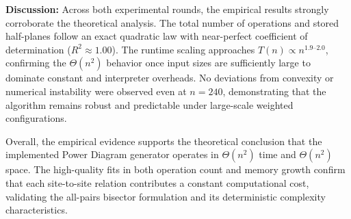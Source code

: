 \documentclass{article}
\begin{document}
\textbf{Discussion:}
Across both experimental rounds, the empirical results strongly corroborate the theoretical analysis.  
The total number of operations and stored half-planes follow an exact quadratic law with near-perfect coefficient of determination ($R^2\!\approx\!1.00$).  
The runtime scaling approaches $T(n)\!\propto\!n^{1.9\text{–}2.0}$, confirming the $\Theta(n^2)$ behavior once input sizes are sufficiently large to dominate constant and interpreter overheads.  
No deviations from convexity or numerical instability were observed even at $n=240$, demonstrating that the algorithm remains robust and predictable under large-scale weighted configurations.

Overall, the empirical evidence supports the theoretical conclusion that the implemented Power Diagram generator operates in $\Theta(n^2)$ time and $\Theta(n^2)$ space.  
The high-quality fits in both operation count and memory growth confirm that each site-to-site relation contributes a constant computational cost, validating the all-pairs bisector formulation and its deterministic complexity characteristics.

\newpage
\end{document}
